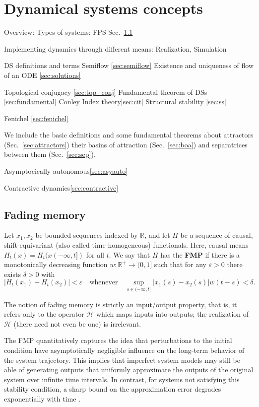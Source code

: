 \documentclass{article}
\newcounter{ct}
\begin{document}
\newpage
\section{Dynamical systems concepts}
Overview: 
Types of systems: FPS Sec.~\ref{sec:fading_memory}

Implementing dynamics through different means: Realization\label{sec:realization}, Simulation\label{sec:simulation}

DS definitions and terms 
Semiflow \ref{sec:semiflow}
Existence and uniqueness of flow of an ODE \ref{sec:solutions}

Topological conjugacy \ref{sec:top_conj}
Fundamental theorem of DSs \ref{sec:fundamental}
Conley Index theory\ref{sec:cit}
Structural stability \ref{sec:ss}

Fenichel \ref{sec:fenichel}

We include the basic definitions and some fundamental theorems about attractors (Sec.~\ref{sec:attractors})
their basins of attraction (Sec.~\ref{sec:boa}) and separatrices between them (Sec.~\ref{sec:sep}).

Asymptocically autonomous\ref{sec:asyauto}

Contractive dynamics\ref{sec:contractive}



\subsection{Fading memory}\label{sec:fading_memory}

\begin{definition}\label{def:fmp}
Let $x_1, x_2$ be bounded sequences indexed by $\mathbb{R}$, and let $H$ be a sequence of causal, shift-equivariant (also called time-homogeneous) functionals.
Here, causal means $H_t(x) = H_t(x(-\infty,t])$ for all $t$.
We say that $H$ has the \textbf{FMP} if there is a monotonically decreasing function $w : \mathbb{R}^+ \to (0, 1]$ such that for any $\varepsilon > 0$ there exists $\delta > 0$ with 
\[
|H_t(x_1) - H_t(x_2)| < \varepsilon \quad \text{whenever} \quad \sup_{s \in (-\infty, t]} |x_1(s) - x_2(s)| w(t - s) < \delta.
\]
\end{definition}
The notion of fading memory is strictly an input/output property, that is, it refers only to the operator $\mathcal{H}$ which maps inputs into outputs; the realization of $\mathcal{H}$ (there need not even be one) is irrelevant.

\begin{remark}\label{rem:fmp}%
The FMP quantitatively captures the idea that perturbations to the initial condition have asymptotically negligible influence on the long-term behavior of the system trajectory.
This implies that imperfect system models may still be able of generating outputs that uniformly approximate the outputs of the original system over infinite time intervals.
In contrast, for systems not satisfying this stability condition, a sharp bound on the approximation error degrades exponentially with time  \citep{hirsch1974nonautonomous, sontag2013mathematical}.
\end{remark}
\end{document}
